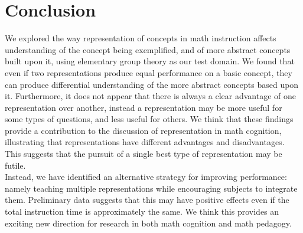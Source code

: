 \documentclass[11pt]{article}
\begin{document}
\section{Conclusion}
We explored the way representation of concepts in math instruction affects understanding of the concept being exemplified, and of more abstract concepts built upon it, using elementary group theory as our test domain. We found that even if two representations produce equal performance on a basic concept, they can produce differential understanding of the more abstract concepts based upon it. Furthermore, it does not appear that there is always a clear advantage of one representation over another, instead a representation may be more useful for some types of questions, and less useful for others. We think that these findings provide a contribution to the discussion of representation in math cognition, illustrating that representations have different advantages and disadvantages. This suggests that the pursuit of a single best type of representation may be futile. \\[11pt]
Instead, we have identified an alternative strategy for improving performance: namely teaching multiple representations while encouraging subjects to integrate them. Preliminary data suggests that this may have positive effects even if the total instruction time is approximately the same. We think this provides an exciting new direction for research in both math cognition and math pedagogy. 
 




\newpage
\setcounter{secnumdepth}{-1}
\end{document}
